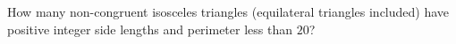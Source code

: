 How many non-congruent isosceles triangles (equilateral triangles included) have positive integer side lengths and perimeter less than $20$?
